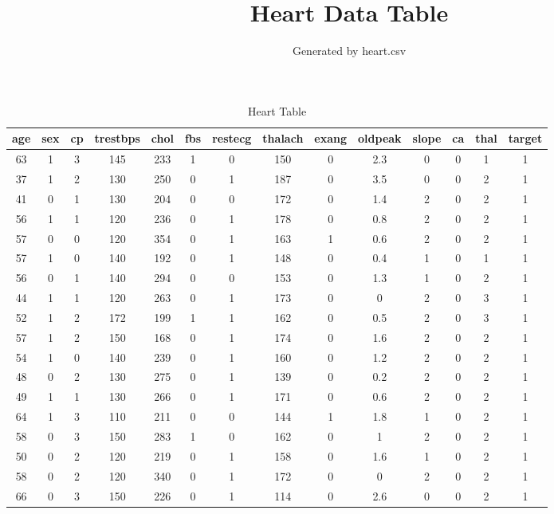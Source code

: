 \documentclass{article}
\title{Heart Data Table}
\author{Generated by heart.csv}
\begin{document}
\maketitle
\begin{longtable}{|c|c|c|c|c|c|c|c|c|c|c|c|c|c|}
\caption{Heart Table} \\
\hline
\textbf{age} & \textbf{sex} & \textbf{cp} & \textbf{trestbps} & \textbf{chol} & \textbf{fbs} & \textbf{restecg} & \textbf{thalach} & \textbf{exang} & \textbf{oldpeak} & \textbf{slope} & \textbf{ca} & \textbf{thal} & \textbf{target} \\ \hline
63 & 1 & 3 & 145 & 233 & 1 & 0 & 150 & 0 & 2.3 & 0 & 0 & 1 & 1 \\ \hline
37 & 1 & 2 & 130 & 250 & 0 & 1 & 187 & 0 & 3.5 & 0 & 0 & 2 & 1 \\ \hline
41 & 0 & 1 & 130 & 204 & 0 & 0 & 172 & 0 & 1.4 & 2 & 0 & 2 & 1 \\ \hline
56 & 1 & 1 & 120 & 236 & 0 & 1 & 178 & 0 & 0.8 & 2 & 0 & 2 & 1 \\ \hline
57 & 0 & 0 & 120 & 354 & 0 & 1 & 163 & 1 & 0.6 & 2 & 0 & 2 & 1 \\ \hline
57 & 1 & 0 & 140 & 192 & 0 & 1 & 148 & 0 & 0.4 & 1 & 0 & 1 & 1 \\ \hline
56 & 0 & 1 & 140 & 294 & 0 & 0 & 153 & 0 & 1.3 & 1 & 0 & 2 & 1 \\ \hline
44 & 1 & 1 & 120 & 263 & 0 & 1 & 173 & 0 & 0 & 2 & 0 & 3 & 1 \\ \hline
52 & 1 & 2 & 172 & 199 & 1 & 1 & 162 & 0 & 0.5 & 2 & 0 & 3 & 1 \\ \hline
57 & 1 & 2 & 150 & 168 & 0 & 1 & 174 & 0 & 1.6 & 2 & 0 & 2 & 1 \\ \hline
54 & 1 & 0 & 140 & 239 & 0 & 1 & 160 & 0 & 1.2 & 2 & 0 & 2 & 1 \\ \hline
48 & 0 & 2 & 130 & 275 & 0 & 1 & 139 & 0 & 0.2 & 2 & 0 & 2 & 1 \\ \hline
49 & 1 & 1 & 130 & 266 & 0 & 1 & 171 & 0 & 0.6 & 2 & 0 & 2 & 1 \\ \hline
64 & 1 & 3 & 110 & 211 & 0 & 0 & 144 & 1 & 1.8 & 1 & 0 & 2 & 1 \\ \hline
58 & 0 & 3 & 150 & 283 & 1 & 0 & 162 & 0 & 1 & 2 & 0 & 2 & 1 \\ \hline
50 & 0 & 2 & 120 & 219 & 0 & 1 & 158 & 0 & 1.6 & 1 & 0 & 2 & 1 \\ \hline
58 & 0 & 2 & 120 & 340 & 0 & 1 & 172 & 0 & 0 & 2 & 0 & 2 & 1 \\ \hline
66 & 0 & 3 & 150 & 226 & 0 & 1 & 114 & 0 & 2.6 & 0 & 0 & 2 & 1 \\ \hline

\end{longtable}
\end{document}
